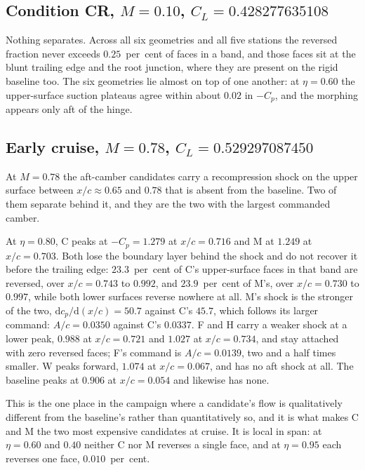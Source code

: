 \subsection{Condition CR, \texorpdfstring{$M = 0.10$, $C_L = 0.428277635108$}{M 0.10, CL 0.428277635108}}
\label{sec:app:sections:cr}

Nothing separates. Across all six geometries and all five stations the reversed fraction never
exceeds $0.25$~per~cent of faces in a band, and those faces sit at the blunt trailing edge and
the root junction, where they are present on the rigid baseline too. The six geometries lie
almost on top of one another: at $\eta = 0.60$ the upper-surface suction plateaus agree within
about $0.02$ in $-C_p$, and the morphing appears only aft of the hinge.

\subsection{Early cruise, \texorpdfstring{$M = 0.78$, $C_L = 0.529297087450$}{M 0.78, CL 0.529297087450}}
\label{sec:app:sections:ec}

At $M = 0.78$ the aft-camber candidates carry a recompression shock on the upper surface between
$x/c \approx 0.65$ and $0.78$ that is absent from the baseline. Two of them separate behind it,
and they are the two with the largest commanded camber.

At $\eta = 0.80$, C peaks at $-C_p = 1.279$ at $x/c = 0.716$ and M at $1.249$ at $x/c = 0.703$.
Both lose the boundary layer behind the shock and do not recover it before the trailing edge:
$23.3$~per~cent of C's upper-surface faces in that band are reversed, over $x/c = 0.743$ to
$0.992$, and $23.9$~per~cent of M's, over $x/c = 0.730$ to $0.997$, while both lower surfaces
reverse nowhere at all. M's shock is the stronger of the two, $\mathrm{d}c_p/\mathrm{d}(x/c) =
50.7$ against C's $45.7$, which follows its larger command: $A/c = 0.0350$ against C's $0.0337$. F
and H carry a weaker shock at a lower peak, $0.988$ at $x/c = 0.721$ and $1.027$ at
$x/c = 0.734$, and stay attached with zero reversed faces; F's command is $A/c = 0.0139$, two and
a half times smaller. W peaks forward, $1.074$ at $x/c = 0.067$, and has no aft shock at all. The
baseline peaks at $0.906$ at $x/c = 0.054$ and likewise has none.

This is the one place in the campaign where a candidate's flow is qualitatively different from
the baseline's rather than quantitatively so, and it is what makes C and M the two most expensive
candidates at cruise. It is local in span: at $\eta = 0.60$ and $0.40$ neither C nor M reverses a
single face, and at $\eta = 0.95$ each reverses one face, $0.010$~per~cent.

